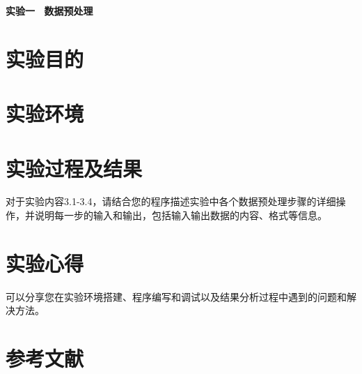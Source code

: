 \documentclass{ML}
\begin{document}
\maketitle

\tableofcontents
\newpage

\begin{center}
    \textbf{ 实验一 \  数据预处理}
\end{center}

\section{实验目的}

\section{实验环境}

\section{实验过程及结果}
对于实验内容3.1-3.4，请结合您的程序描述实验中各个数据预处理步骤的详细操作，并说明每一步的输入和输出，包括输入输出数据的内容、格式等信息。
\section{实验心得}
可以分享您在实验环境搭建、程序编写和调试以及结果分析过程中遇到的问题和解决方法。
\appendix

\section{参考文献}
\end{document}
